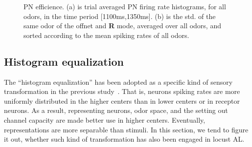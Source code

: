 \documentclass[12pt, a4paper]{article}
\begin{document}
\begin{figure}[htbp]\centering
    \hspace{0.5cm}
    \subfigure[Selectivity]{\label{Fig2plus:selectivity}
    \begin{overpic}[scale=0.3]{figures/fig2plus/lifetimeSparseness.eps} \end{overpic}
    } %

\caption[PN~efficience]{\label{Figure2plus:PNefficience} \small PN efficience. (a) is trial averaged PN firing rate histograms, for all odors, in the time period [1100ms,1350ms]. (b) is the std. of the same odor of the offnet and {\bf R} mode, averaged over all odors, and sorted according to the mean spiking rates of all odors.}
\end{figure}


\subsection{Histogram equalization} \label{Sect:histeq}
The ``histogram equalization'' has been adopted as a specific kind of sensory transformation in the previous study~\citep{}. That is, neurons spiking rates are more uniformly distributed in the higher centers than in lower centers or in receptor neurons. As a result, representing neurons, odor space, and the setting out channel capacity are made better use in higher centers. Eventually, representations are more separable than stimuli. In this section, we tend to figure it out, whether such kind of transformation has also been engaged in locust AL.
\end{document}
